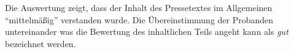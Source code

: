 Die Auswertung zeigt, dass der Inhalt des Pressetextes im Allgemeinen
\enquote{mittelmäßig} verstanden wurde. Die Übereinstimmung der Probanden
untereinander was die Bewertung des inhaltlichen Teils angeht kann als
\emph{gut} bezeichnet werden.








